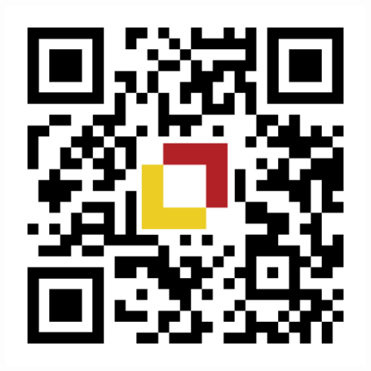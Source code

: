\documentclass[aspectratio=169]{beamer}
\begin{document}
\begin{frame}
\begin{columns}
    \begin{column}{0.25\textwidth}
	\begin{center}	
		\bigskip
		\includegraphics[scale=0.1]{assets/qr-code.pdf}
	\end{center}
    \end{column}
\end{columns}

\end{frame}
\end{document}
